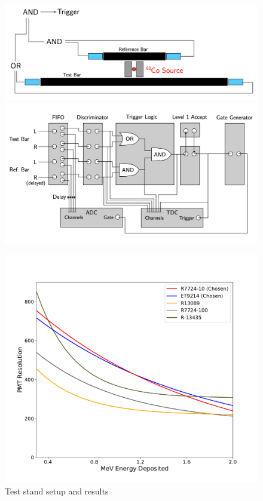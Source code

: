 \documentclass[review]{elsarticle}
\begin{document}
\begin{figure}[h!]
	\centering
	\begin{minipage}{0.48\textwidth}
		\includegraphics[width=\textwidth]{phys_setup.png} \\
		\includegraphics[width=\textwidth]{electr_setup.png}
	\end{minipage}
	\begin{minipage}{0.48\textwidth}
		\includegraphics[width=\textwidth]{test-stand/test-resolutions.pdf}
	\end{minipage}
	\caption{Test stand setup and results}
	\label{fig:test_stand}

\end{figure}
\end{document}
